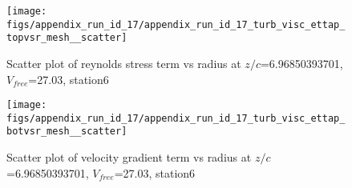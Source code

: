 \begin{figure}[H]
\centering
\texttt{[image: figs/appendix\_run\_id\_17/appendix\_run\_id\_17\_turb\_visc\_ettap\_topvsr\_mesh\_\_scatter]}
\caption{Scatter plot of reynolds stress term vs radius at $z/c$=6.96850393701, $V_{free}$=27.03, station6}
\label{fig:appendix_run_id_17_turb_visc_ettap_topvsr_mesh__scatter}
\end{figure}


\begin{figure}[H]
\centering
\texttt{[image: figs/appendix\_run\_id\_17/appendix\_run\_id\_17\_turb\_visc\_ettap\_botvsr\_mesh\_\_scatter]}
\caption{Scatter plot of velocity gradient term vs radius at $z/c$=6.96850393701, $V_{free}$=27.03, station6}
\label{fig:appendix_run_id_17_turb_visc_ettap_botvsr_mesh__scatter}
\end{figure}


